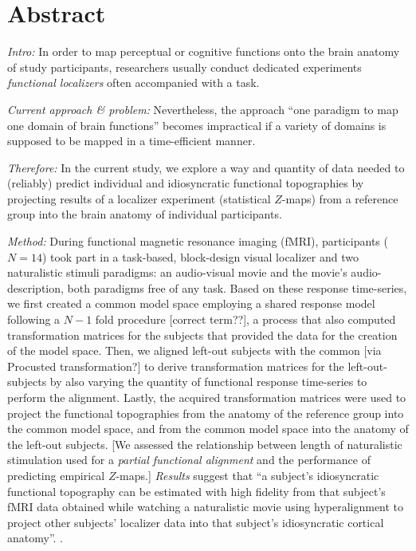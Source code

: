 \section{Abstract}
\textit{Intro:} In order to map perceptual or cognitive functions onto the brain
anatomy of study participants, researchers usually conduct dedicated experiments
\textit{functional localizers} often accompanied with a task.

\textit{Current approach \& problem:} Nevertheless, the approach ``one paradigm
to map one domain of brain functions'' becomes impractical if a variety of
domains is supposed to be mapped in a time-efficient manner.

\textit{Therefore:} In the current study, we explore a way and quantity of data
needed to (reliably) predict individual and idiosyncratic functional
topographies by projecting results of a localizer experiment (statistical
$Z$-maps) from a reference group into the brain anatomy of individual
participants.

\textit{Method:}
During functional magnetic resonance imaging (fMRI), participants ($N=14$) took
part in a task-based, block-design visual localizer and two naturalistic stimuli
paradigms: an audio-visual movie and the movie's audio-description, both
paradigms free of any task.
Based on these response time-series, we first created a common model space
employing a shared response model \citep{chen2015reduced} following a $N-1$ fold
procedure [correct term??], a process that also computed transformation matrices
for the subjects that provided the data for the creation of the model space.
Then, we aligned left-out subjects with the common [via Procusted
transformation?] to derive transformation matrices for the left-out-subjects by
also varying the quantity of functional response time-series to perform the
alignment.
Lastly, the acquired transformation matrices were used to project the functional
topographies from the anatomy of the reference group into the common model
space, and from the common model space into the anatomy of the left-out
subjects.
[We assessed the relationship between length of naturalistic stimulation used
for a \textit{partial functional alignment} and the performance of predicting
empirical $Z$-maps.]
%
\textit{Results} suggest that ``a subject's idiosyncratic functional topography
can be estimated with high fidelity from that subject's fMRI data obtained while
watching a naturalistic movie using hyperalignment to project other subjects’
localizer data into that subject's idiosyncratic cortical anatomy''.
\citep{jiahui2020predicting}.


